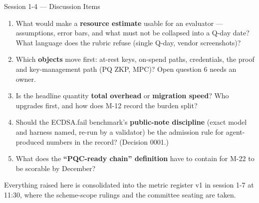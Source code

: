 \documentclass[aspectratio=169,10pt]{beamer}
\begin{document}
\begin{frame}{Session 1-4 --- Discussion Items}
  \begin{enumerate}\small
    \item What would make a \textbf{resource estimate} usable for an evaluator --- assumptions, error bars, and what must not be collapsed into a Q-day date? What language does the rubric refuse (single Q-day, vendor screenshots)?
    \item Which \textbf{objects} move first: at-rest keys, on-spend paths, credentials, the proof and key-management path (PQ ZKP, MPC)? Open question 6 needs an owner.
    \item Is the headline quantity \textbf{total overhead} or \textbf{migration speed}? Who upgrades first, and how does M-12 record the burden split?
    \item Should the ECDSA.fail benchmark's \textbf{public-note discipline} (exact model and harness named, re-run by a validator) be the admission rule for agent-produced numbers in the record? (Decision 0001.)
    \item What does the \textbf{``PQC-ready chain'' definition} have to contain for M-22 to be scorable by December?
  \end{enumerate}
  \par\vspace{1mm}
  {\small Everything raised here is consolidated into the metric register v1 in session 1-7 at 11:30, where the scheme-scope rulings and the committee seating are taken.}
\end{frame}
\end{document}
